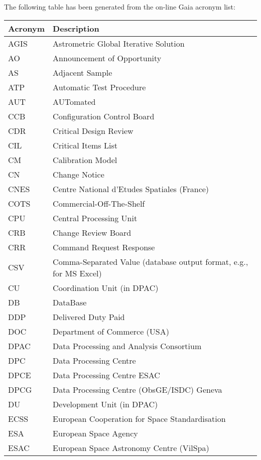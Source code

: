 The following table has been generated from the on-line Gaia acronym list:
\newline\newline%
\addtocounter{table}{-1}
\begin{longtable}{|l|p{}|}\hline 
\textbf{Acronym} & \textbf{Description}  \\\hline
AGIS&Astrometric Global Iterative Solution \\\hline
AO&Announcement of Opportunity \\\hline
AS&Adjacent Sample \\\hline
ATP&Automatic Test Procedure \\\hline
AUT&AUTomated \\\hline
CCB&Configuration Control Board \\\hline
CDR&Critical Design Review \\\hline
CIL&Critical Items List \\\hline
CM&Calibration Model \\\hline
CN&Change Notice \\\hline
CNES&Centre National d'Etudes Spatiales (France) \\\hline
COTS&Commercial-Off-The-Shelf \\\hline
CPU&Central Processing Unit \\\hline
CRB&Change Review Board \\\hline
CRR&Command Request Response \\\hline
CSV&Comma-Separated Value (database output format, e.g., for MS Excel) \\\hline
CU&Coordination Unit (in DPAC) \\\hline
DB&DataBase \\\hline
DDP&Delivered Duty Paid \\\hline
DOC&Department of Commerce (USA) \\\hline
DPAC&Data Processing and Analysis Consortium \\\hline
DPC&Data Processing Centre \\\hline
DPCE&Data Processing Centre ESAC \\\hline
DPCG&Data Processing Centre (ObsGE/ISDC) Geneva \\\hline
DU&Development Unit (in DPAC) \\\hline
ECSS&European Cooperation for Space Standardisation \\\hline
ESA&European Space Agency \\\hline
ESAC&European Space Astronomy Centre (VilSpa) \\\hline

\end{longtable}
